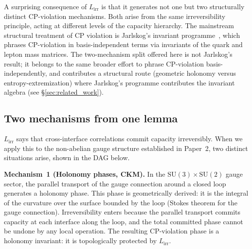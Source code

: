 \documentclass[11pt]{article}
\newcommand{\SU}{\mathrm{SU}}
\begin{document}
A surprising consequence of $L_{\mathrm{irr}}$ is that it generates not one
but two structurally distinct CP-violation mechanisms.  Both arise from the
same irreversibility principle, acting at different levels of the capacity
hierarchy.  The mainstream structural treatment of CP violation is Jarlskog's
invariant programme~\cite{Jarlskog2005,Jarlskog2012}, which phrases
CP-violation in basis-independent terms via invariants of the quark and
lepton mass matrices.  The two-mechanism split offered here is not
Jarlskog's result; it belongs to the same broader effort to phrase CP-violation
basis-independently, and contributes a structural route (geometric holonomy
versus entropy-extremization) where Jarlskog's programme contributes the
invariant algebra (see \S\ref{sec:related_work}).

\subsection{Two mechanisms from one lemma}

$L_{\mathrm{irr}}$ says that cross-interface correlations commit capacity
irreversibly.  When we apply this to the non-abelian gauge structure
established in Paper~2, two distinct situations arise, shown in the DAG below.

\begin{center}
\end{center}

\textbf{Mechanism~1 (Holonomy phases, CKM).}  In the $\SU(3)\times\SU(2)$
gauge sector, the parallel transport of the gauge connection around a closed
loop generates a holonomy phase.  This phase is geometrically derived: it is
the integral of the curvature over the surface bounded by the loop (Stokes
theorem for the gauge connection).  Irreversibility enters because the
parallel transport commits capacity at each interface along the loop, and
the total committed phase cannot be undone by any local operation.  The
resulting CP-violation phase is a holonomy invariant: it is topologically
protected by $L_{\mathrm{irr}}$.
\end{document}
